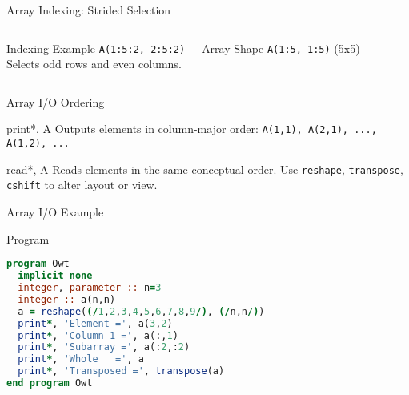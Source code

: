 \begin{frame}[fragile]{Array Indexing: Strided Selection}
  \begin{columns}[T]
    \begin{block}{Indexing Example}
      \texttt{A(1:5:2, 2:5:2)}\\[0.5em]
      Selects odd rows and even columns.
    \end{block}
    \begin{block}{Array Shape}
      \texttt{A(1:5, 1:5)} (5x5)
    \end{block}

  \end{columns}
\end{frame}



\begin{frame}{Array I/O Ordering}
  \begin{block}{print*, A}
    Outputs elements in column-major order: \texttt{A(1,1), A(2,1), ..., A(1,2), ...}
  \end{block}
  \begin{block}{read*, A}
    Reads elements in the same conceptual order. Use \texttt{reshape}, \texttt{transpose}, \texttt{cshift} to alter layout or view.
  \end{block}
\end{frame}

\begin{frame}[fragile]{Array I/O Example}
\begin{block}{Program}
\begin{lstlisting}[language=Fortran]
program Owt
  implicit none
  integer, parameter :: n=3
  integer :: a(n,n)
  a = reshape((/1,2,3,4,5,6,7,8,9/), (/n,n/))
  print*, 'Element =', a(3,2)
  print*, 'Column 1 =', a(:,1)
  print*, 'Subarray =', a(:2,:2)
  print*, 'Whole   =', a
  print*, 'Transposed =', transpose(a)
end program Owt
\end{lstlisting}
\end{block}
\end{frame}

